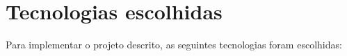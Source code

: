 \chapter{Tecnologias escolhidas}
\label{c.tecnologias}


Para implementar o projeto descrito, as seguintes tecnologias foram escolhidas:

